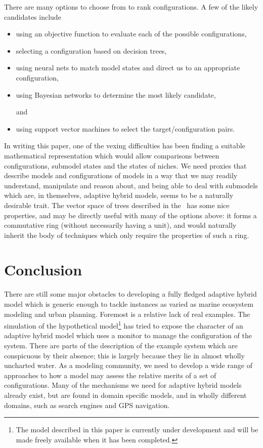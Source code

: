 
There are many options to choose from to rank con\-fig\-ur\-a\-tions. A few of
the likely candidates include
\begin{itemize}
  \item using an objective function to evaluate each of the possible
    con\-fig\-ur\-a\-tions,
  \item selecting a con\-fig\-ur\-a\-tion based
    on decision trees,
  \item
    using neural nets to match model states and direct
    us to an appropriate con\-fig\-ur\-a\-tion,
  \item using Bayesian networks to determine the most likely
    candidate,
  \item[and]
  \item using support vector machines to select the
    target/con\-fig\-ur\-a\-tion pairs.
\end{itemize}

In writing this paper, one of the vexing difficulties has been finding
a suitable math\-e\-mat\-i\-cal rep\-re\-sen\-ta\-tion which would allow comparisons
between con\-fig\-ur\-a\-tions, sub\-model states and the states of niches.  We
need proxies that describe models and con\-fig\-ur\-a\-tions of models in a
way that we may readily understand, manipulate and reason about, and
being able to deal with sub\-models which are, in themselves, adaptive
hybrid models, seems to be a naturally desirable trait.  The vector
space of trees described in the \appendixname\ has some nice
properties, and may be directly useful with many of the options above:
it forms a commutative ring (without necessarily having a unit), and
would naturally inherit the body of techniques which only require the
properties of such a ring.

\section{Conclusion}

There are still some major obstacles to developing a fully fledged
adaptive hybrid model which is generic enough to tackle instances as
varied as marine ecosystem modeling and urban planning. Foremost is a
relative lack of real examples.  The simulation of the hypothetical
model\footnote{The model described in this paper is currently under
  development and will be made freely available when it has been
  completed.}  has tried to expose the character of an adaptive hybrid
model which uses a monitor to manage the con\-fig\-ur\-a\-tion of the system.
There are parts of the description of the example system which are
conspicuous by their absence; this is largely because they lie in
almost wholly uncharted water.  As a modeling community, we need to
develop a wide range of approaches to how a model may assess the
relative merits of a set of con\-fig\-ur\-a\-tions. Many of the mechanisms we
need for adaptive hybrid models already exist, but are found in domain
specific models, and in wholly different domains, such as search
engines and GPS navigation.

